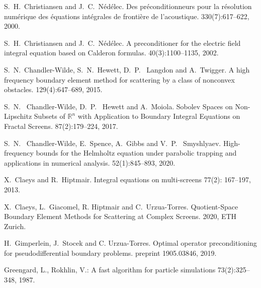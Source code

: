 \documentclass[]{article}
\begin{document}
\begin{scriptsize}
\begin{thebibliography}{0}
		S.~H.~Christiansen and J.~C.~Nédélec.
		\newblock Des préconditionneurs pour la résolution numérique des équations intégrales de frontière de l'acoustique.
		  330(7):617--622, 2000.
		
		S.~H.~Christiansen and J.~C.~Nédélec.
		\newblock A preconditioner for the electric field integral equation based on Calderon formulas.
		  40(3):1100--1135, 2002.
		
		S.~N.~Chandler-Wilde, S.~N.~Hewett, D.~P.~ Langdon and A.~Twigger.
		\newblock A high frequency boundary element method for scattering by a class of nonconvex obstacles.
		 129(4):647--689, 2015.
		
		S.~N.~ Chandler-Wilde, D.~P.~ Hewett and A.~Moiola.
		\newblock Sobolev Spaces on Non-Lipschitz Subsets of ${\mathbb {R}}^n$ with Application to Boundary Integral Equations on Fractal Screens. 
		 87(2):179--224, 2017.
		
		S.~N.~ Chandler-Wilde, E.~Spence, A.~Gibbs and V.~P.~ Smyshlyaev.
		\newblock High-frequency bounds for the Helmholtz equation under parabolic trapping and applications in numerical analysis.
		52(1):845--893, 2020.	
		
		X.~Claeys and R.~Hiptmair.
		\newblock Integral equations on multi-screens
		 77(2): 167--197, 2013.
		
		X.~Claeys, L.~Giacomel, R. Hiptmair and C.~Urzua-Torres.
		\newblock Quotient-Space Boundary Element Methods for Scattering at Complex Screens.
		 2020, ETH Zurich.
		
		H.~Gimperlein, J.~Stocek and C. Urzua-Torres.
		\newblock Optimal operator preconditioning for pseudodifferential boundary problems.
		 preprint 1905.03846, 2019.
		
		Greengard, L., Rokhlin, V.:
		\newblock A fast algorithm for particle simulations
		 73(2):325--348, 1987.
		

\end{thebibliography}
\end{scriptsize}
\end{document}
